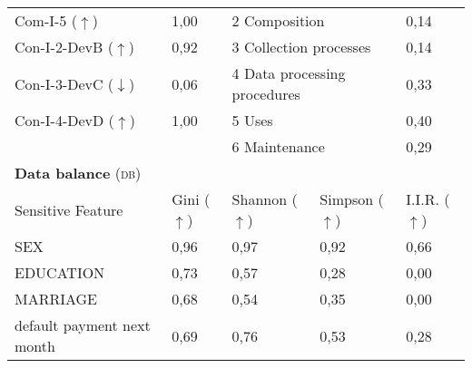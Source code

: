 \begin{table}[h]
\begin{tabular}{|p{3cm}|p{1.9cm}p{3cm}p{2.6cm}p{1.6cm}|}
        Com-I-5 ($\uparrow$) & 1,00\cellcolor[HTML]{FFFFFF} & \multicolumn{2}{|l|}{2 Composition} & 0,14\cellcolor[HTML]{FCA186} \\
        Con-I-2-DevB ($\uparrow$) & 0,92\cellcolor[HTML]{FEF5F3} & \multicolumn{2}{|l|}{3 Collection processes} & 0,14\cellcolor[HTML]{FCA186} \\
        Con-I-3-DevC ($\downarrow$) & 0,06\cellcolor[HTML]{FEF8F6} & \multicolumn{2}{|l|}{4 Data processing procedures} & 0,33\cellcolor[HTML]{FDB6A0} \\
        Con-I-4-DevD ($\uparrow$) & 1,00\cellcolor[HTML]{FFFFFF} & \multicolumn{2}{|l|}{5 Uses} & 0,40\cellcolor[HTML]{FDBDAA} \\ 
         & & \multicolumn{2}{|l|}{6 Maintenance} & 0,29\cellcolor[HTML]{FCB19A} \\ \hline
        \multicolumn{5}{|l|}{\textbf{Data balance} (\textsc{db})} \\ \hline 
 		Sensitive Feature & Gini ($\uparrow$) & Shannon ($\uparrow$) & Simpson ($\uparrow$) & I.I.R. ($\uparrow$) \\ \hline
        SEX & 0,96 & 0,97 & 0,92 & 0,66 \\
		EDUCATION & 0,73 & 0,57 & 0,28\cellcolor[HTML]{fc8d59} & 0,00\cellcolor[HTML]{fc8d59} \\
		MARRIAGE & 0,68 & 0,54 & 0,35 & 0,00\cellcolor[HTML]{fc8d59} \\
		default payment next month & 0,69 & 0,76 & 0,53 & 0,28 \\
		 \hline
    \end{tabular}
\end{table}